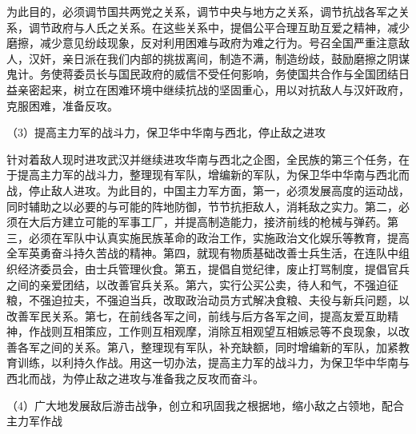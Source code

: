 \documentclass[UTF8, 12pt, a4paper]{ctexrep}
\begin{document}
为此目的，必须调节国共两党之关系，调节中央与地方之关系，调节抗战各军之关系，调节政府与人氏之关系。在这些关系中，提倡公平合理互助互爱之精神，减少磨擦，减少意见纷歧现象，反对利用困难与政府为难之行为。号召全国严重注意敌人，汉奸，亲日派在我们内部的挑拔离间，制造不满，制造纷歧，鼓励磨擦之阴谋鬼计。务使蒋委员长与国民政府的威信不受任何影响，务使国共合作与全国团结日益亲密起来，树立在困难环境中继续抗战的坚固重心，用以对抗敌人与汉奸政府，克服困难，准备反攻。

（3）提高主力军的战斗力，保卫华中华南与西北，停止敌之进攻

针对着敌人现时进攻武汉并继续进攻华南与西北之企图，全民族的第三个任务，在于提高主力军的战斗力，整理现有军队，增编新的军队，为保卫华中华南与西北而战，停止敌人进攻。为此目的，中国主力军方面，第一，必须发展高度的运动战，同时辅助之以必要的与可能的阵地防御，节节抗拒敌人，消耗敌之实力。第二，必须在大后方建立可能的军事工厂，并提高制造能力，接济前线的枪械与弹药。第三，必须在军队中认真实施民族革命的政治工作，实施政治文化娱乐等教育，提高全军英勇奋斗持久苦战的精神。第四，就现有物质基础改善士兵生活，在连队中组织经济委员会，由士兵管理伙食。第五，提倡自觉纪律，废止打骂制度，提倡官兵之间的亲爱团结，以改善官兵关系。第六，实行公买公卖，待人和气，不强迫征粮，不强迫拉夫，不强迫当兵，改取政治动员方式解决食粮、夫役与新兵问题，以改善军民关系。第七，在前线各军之间，前线与后方各军之间，提高友爱互助精神，作战则互相策应，工作则互相观摩，消除互相观望互相嫉忌等不良现象，以改善各军之间的关系。第八，整理现有军队，补充缺额，同时增编新的军队，加紧教育训练，以利持久作战。用这一切办法，提高主力军的战斗力，为保卫华中华南与西北而战，为停止敌之进攻与准备我之反攻而奋斗。

（4）广大地发展敌后游击战争，创立和巩固我之根据地，缩小敌之占领地，配合主力军作战
\end{document}

